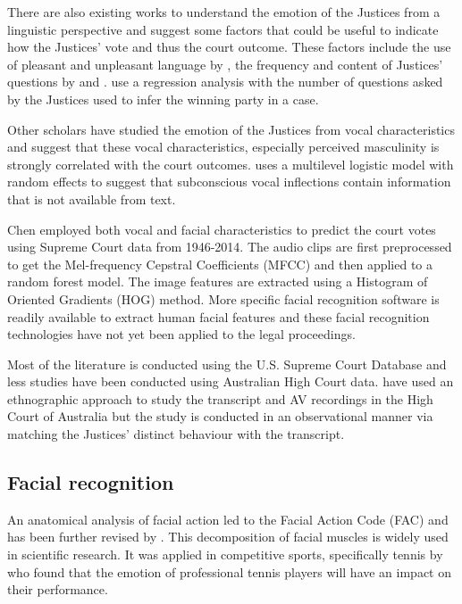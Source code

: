 \documentclass{monashthesis}
\begin{document}
There are also existing works to understand the emotion of the Justices from a linguistic perspective and suggest some factors that could be useful to indicate how the Justices' vote and thus the court outcome. These factors include the use of pleasant and unpleasant language by \textcite{black2011emotions}, the frequency and content of Justices' questions by \textcite{Shullman2004illusion} and \textcite{johnson2009inquiring}. \textcite{epstein2010inferring} use a regression analysis with the number of questions asked by the Justices used to infer the winning party in a case.

Other scholars \autocites{chen2016perceived}{chen2017covering}{schubert1992observing} have studied the emotion of the Justices from vocal characteristics and suggest that these vocal characteristics, especially perceived masculinity is strongly correlated with the court outcomes. \textcite{dietrich2019emotional} uses a multilevel logistic model with random effects to suggest that subconscious vocal inflections contain information that is not available from text.

Chen \autocite*{chen2018justice} employed both vocal and facial characteristics to predict the court votes using Supreme Court data from 1946-2014. The audio clips are first preprocessed to get the Mel-frequency Cepstral Coefficients (MFCC) and then applied to a random forest model. The image features are extracted using a Histogram of Oriented Gradients (HOG) method. More specific facial recognition software is readily available to extract human facial features and these facial recognition technologies have not yet been applied to the legal proceedings.

Most of the literature is conducted using the U.S. Supreme Court Database and less studies have been conducted using Australian High Court data. \textcite{tutton2018judicial} have used an ethnographic approach to study the transcript and AV recordings in the High Court of Australia but the study is conducted in an observational manner via matching the Justices' distinct behaviour with the transcript.

\hypertarget{facial-recognition}{%
\subsection{Facial recognition}\label{facial-recognition}}

An anatomical analysis of facial action \autocite{ekman1976measuring} led to the Facial Action Code (FAC) \autocite{ekman1978} and has been further revised by \textcite{ekman2002facial}. This decomposition of facial muscles is widely used in scientific research. It was applied in competitive sports, specifically tennis by \textcite{kovalchik2018going} who found that the emotion of professional tennis players will have an impact on their performance.
\end{document}
